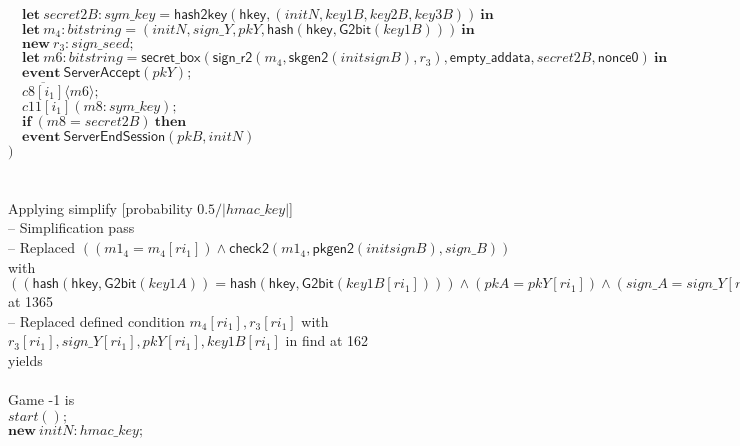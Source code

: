 \documentclass{article}
\newcommand{\cinput}[2]{{#1}({#2})}
\newcommand{\coutput}[2]{\overline{#1}\langle{#2}\rangle}
\newcommand{\kw}[1]{\mathbf{#1}}
\newcommand{\kwf}[1]{\mathsf{#1}}
\newcommand{\var}[1]{\mathit{#1}}
\newcommand{\kwt}[1]{\mathit{#1}}
\newcommand{\kwc}[1]{\mathit{#1}}
\begin{document}
\begin{tabbing}
\>$\quad \kw{let}\ \var{secret2B}: \kwt{sym{\_}key} = \kwf{hash2key}(\kwf{hkey}, \kwf{}(\var{initN}, \var{key1B}, \var{key2B}, \var{key3B}))\ \kw{in}$\\
\>$\quad \kw{let}\ \var{m}_{4}: \kwt{bitstring} = \kwf{}(\var{initN}, \var{sign{\_}Y}, \var{pkY}, \kwf{hash}(\kwf{hkey}, \kwf{G2bit}(\var{key1B})))\ \kw{in}$\\
\>$\quad \kw{new}\ \var{r}_{3}: \kwt{sign{\_}seed};$\\
\>$\quad \kw{let}\ \var{m6}: \kwt{bitstring} = \kwf{secret{\_}box}(\kwf{sign{\_}r2}(\var{m}_{4}, \kwf{skgen2}(\var{initsignB}), \var{r}_{3}), \kwf{empty{\_}addata}, \var{secret2B}, \kwf{nonce0})\ \kw{in}$\\
\>$\quad \kw{event}\ \kwf{ServerAccept}(\var{pkY});$\\
\>$\quad \coutput{\kwc{c8}[\var{i}_{1}]}{\var{m6}};$\\
\>$\quad \cinput{\kwc{c11}[\var{i}_{1}]}{\var{m8}: \kwt{sym{\_}key}};$\\
\>$\quad \kw{if}\ (\var{m8}  =  \var{secret2B})\ \kw{then}$\\
\>$\quad \kw{event}\ \kwf{ServerEndSession}(\var{pkB}, \var{initN})$\\
\>$)$\\
\\
\\
Applying simplify {}[probability $0.5 / |\kwt{hmac{\_}key}|${}]{}\\
\quad -- Simplification pass\\
\qquad -- Replaced $((\var{m1}_{4}  =  \var{m}_{4}[\var{ri}_{1}]) \wedge  \kwf{check2}(\var{m1}_{4}, \kwf{pkgen2}(\var{initsignB}), \var{sign{\_}B}))$ with $((\kwf{hash}(\kwf{hkey}, \kwf{G2bit}(\var{key1A}))  =  \kwf{hash}(\kwf{hkey}, \kwf{G2bit}(\var{key1B}[\var{ri}_{1}]))) \wedge  (\var{pkA}  =  \var{pkY}[\var{ri}_{1}]) \wedge  (\var{sign{\_}A}  =  \var{sign{\_}Y}[\var{ri}_{1}]) \wedge  \kwf{check2}(\var{m1}_{4}, \kwf{pkgen2}(\var{initsignB}), \var{sign{\_}B}))$ at 1365\\
\qquad -- Replaced defined condition $\var{m}_{4}[\var{ri}_{1}], \var{r}_{3}[\var{ri}_{1}]$ with $\var{r}_{3}[\var{ri}_{1}], \var{sign{\_}Y}[\var{ri}_{1}], \var{pkY}[\var{ri}_{1}], \var{key1B}[\var{ri}_{1}]$ in find at 162\\
yields\\
\\
Game -1 is\\
\>$\cinput{\kwc{start}}{};$\\
\>$\kw{new}\ \var{initN}: \kwt{hmac{\_}key};$\\

\end{tabbing}
\end{document}
